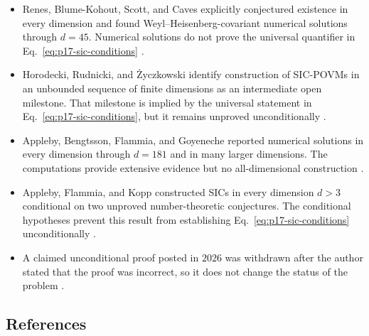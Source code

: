 \begin{itemize}
  \item Renes, Blume-Kohout, Scott, and Caves explicitly conjectured existence
  in every dimension and found Weyl--Heisenberg-covariant numerical solutions
  through $d=45$.  Numerical solutions do not prove the universal quantifier
  in Eq.~\eqref{eq:p17-sic-conditions}
  .

  \item Horodecki, Rudnicki, and \.{Z}yczkowski identify construction of
  SIC-POVMs in an unbounded sequence of finite dimensions as an intermediate
  open milestone.  That milestone is implied by the universal statement in
  Eq.~\eqref{eq:p17-sic-conditions}, but it remains unproved unconditionally
  .

  \item Appleby, Bengtsson, Flammia, and Goyeneche reported numerical solutions
  in every dimension through $d=181$ and in many larger dimensions.  The
  computations provide extensive evidence but no all-dimensional construction
  .

  \item Appleby, Flammia, and Kopp constructed SICs in every dimension $d>3$
  conditional on two unproved number-theoretic conjectures.  The conditional
  hypotheses prevent this result from establishing
  Eq.~\eqref{eq:p17-sic-conditions} unconditionally
  .

  \item A claimed unconditional proof posted in $2026$ was withdrawn after
  the author stated that the proof was incorrect, so it does not change the
  status of the problem
  .
\end{itemize}

\subsection*{References}

